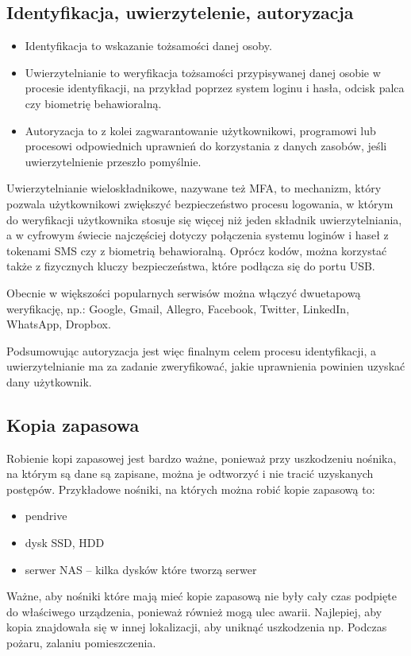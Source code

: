 \documentclass[12pt,a4paper]{article}
\begin{document}
\subsection{Identyfikacja, uwierzytelenie, autoryzacja }
\begin{itemize}
\item Identyfikacja to wskazanie tożsamości danej osoby. 
\item Uwierzytelnianie to weryfikacja tożsamości przypisywanej danej osobie w procesie identyfikacji, na przykład poprzez system loginu i hasła, odcisk palca czy biometrię behawioralną. 
\item Autoryzacja to z kolei zagwarantowanie użytkownikowi, programowi lub procesowi odpowiednich uprawnień do korzystania z danych zasobów, jeśli uwierzytelnienie przeszło pomyślnie. 

\end{itemize}

Uwierzytelnianie wieloskładnikowe, nazywane też MFA, to mechanizm, który pozwala użytkownikowi zwiększyć bezpieczeństwo procesu logowania, w którym do weryfikacji użytkownika stosuje się więcej niż jeden składnik uwierzytelniania, a w cyfrowym świecie najczęściej dotyczy połączenia systemu loginów i haseł z tokenami SMS czy z biometrią behawioralną. Oprócz kodów, można korzystać także z fizycznych kluczy bezpieczeństwa, które podłącza się do portu USB. 

Obecnie w większości popularnych serwisów można włączyć dwuetapową weryfikację, np.: Google, Gmail, Allegro, Facebook, Twitter, LinkedIn, WhatsApp, Dropbox. 

Podsumowując autoryzacja jest więc finalnym celem procesu identyfikacji, a uwierzytelnianie ma za zadanie zweryfikować, jakie uprawnienia powinien uzyskać dany użytkownik. 

\subsection{Kopia zapasowa}
Robienie kopi zapasowej jest bardzo ważne, ponieważ przy uszkodzeniu nośnika, na którym są dane są zapisane, można je odtworzyć i nie tracić uzyskanych postępów. Przykładowe nośniki, na których można robić kopie zapasową to: 
\begin{itemize}
 \item pendrive 
\item dysk SSD, HDD 
\item serwer NAS – kilka dysków które tworzą serwer 
\end{itemize}
 Ważne, aby nośniki które mają mieć kopie zapasową nie były cały czas podpięte do właściwego urządzenia, ponieważ również mogą ulec awarii.  Najlepiej, aby kopia znajdowała się w innej lokalizacji, aby uniknąć uszkodzenia np. Podczas pożaru, zalaniu pomieszczenia. 
\end{document}

